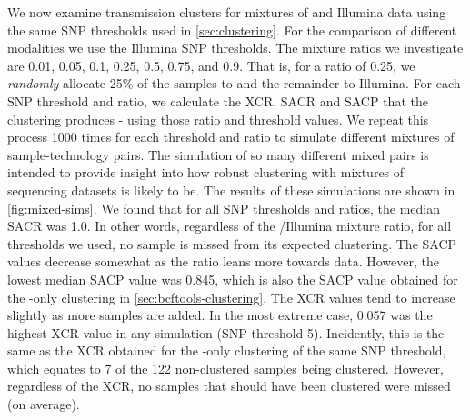 We now examine transmission clusters for mixtures of \ont{} and
Illumina data using the same SNP thresholds used in \autoref{sec:clustering}. For the comparison of different
modalities we use the Illumina SNP thresholds. The mixture
ratios we investigate are 0.01, 0.05, 0.1, 0.25, 0.5, 0.75, and 0.9.
That is, for a ratio of 0.25, we \emph{randomly} allocate 25\% of the samples
to \ont{} and the remainder to Illumina. For each SNP threshold and
ratio, we calculate the XCR, SACR and SACP that the clustering produces
- using those ratio and threshold values. We repeat this process 1000
times for each threshold and ratio to simulate different mixtures of
sample-technology pairs. The simulation of so many different mixed pairs
is intended to provide insight into how robust clustering with mixtures
of sequencing datasets is likely to be. 
The results of these simulations
are shown in \autoref{fig:mixed-sims}. We found that for
all SNP thresholds and ratios, the median SACR was 1.0. In other words,
regardless of the \ont{}/Illumina mixture ratio, for all thresholds we
used, no sample is missed from its expected clustering. The SACP values
decrease somewhat as the ratio leans more towards \ont{} data.
However, the lowest median SACP value was 0.845, which is also the SACP
value obtained for the \ont{}-only clustering in
\autoref{sec:bcftools-clustering}. The XCR values tend to increase
slightly as more \ont{} samples are added. In the most extreme case,
0.057 was the highest XCR value in any simulation (SNP threshold 5).
Incidently, this is the same as the XCR obtained for the \ont{}-only
clustering of the same SNP threshold, which equates to 7 of the 122
non-clustered samples being clustered. However, regardless of the XCR,
no samples that should have been clustered were missed (on average).

